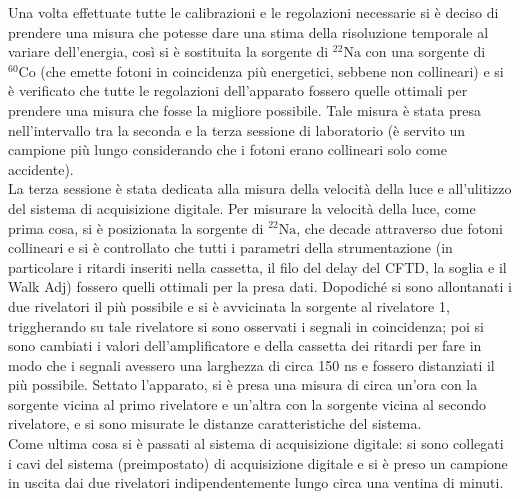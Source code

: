 Una volta effettuate tutte le calibrazioni e le regolazioni necessarie si è deciso di prendere una misura che potesse dare una stima della risoluzione temporale al
variare dell'energia, così si è sostituita la sorgente di $^{22}\text{Na}$ con una sorgente di $^{60}\text{Co}$ (che emette fotoni in coincidenza più energetici, sebbene non collineari)
e si è verificato che tutte le regolazioni dell'apparato fossero quelle ottimali per prendere una misura che fosse la migliore possibile. Tale misura è stata presa
nell'intervallo tra la seconda e la terza sessione di laboratorio (è servito un campione più  lungo considerando che i fotoni erano collineari solo come accidente).\\

La terza sessione è stata dedicata alla misura della velocità della luce e all'ulitizzo del sistema di acquisizione digitale. Per misurare la velocità della luce,
come prima cosa, si è posizionata la sorgente di $^{22}\text{Na}$, che decade attraverso due fotoni collineari e si è controllato che tutti i parametri della strumentazione
(in particolare i ritardi inseriti nella cassetta, il filo del delay del CFTD, la soglia e il Walk Adj) fossero quelli ottimali per la presa dati. Dopodiché si sono allontanati
i due rivelatori il più possibile e
si è avvicinata la sorgente al rivelatore 1, triggherando su tale rivelatore si sono osservati i segnali in coincidenza; poi si sono cambiati i valori dell'amplificatore
e della cassetta dei ritardi per fare in modo che i segnali avessero una larghezza di circa 150 ns e fossero distanziati il più possibile. Settato l'apparato, si è presa una
misura di circa un'ora con la sorgente vicina al primo rivelatore e un'altra con la sorgente vicina al secondo rivelatore, e si sono misurate le distanze caratteristiche del 
sistema.\\

Come ultima cosa si è passati al sistema di acquisizione digitale: si sono collegati i cavi del sistema (preimpostato) di acquisizione digitale
e si è preso un campione in uscita dai due rivelatori indipendentemente lungo circa una ventina di minuti.
